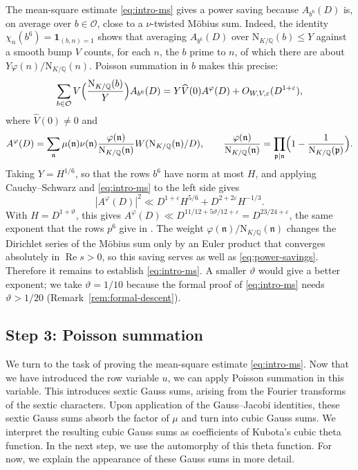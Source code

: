 \documentclass[11pt,a4paper]{article}
\numberwithin{equation}{section}
\numberwithin{figure}{section}
\theoremstyle{definition}
\theoremstyle{remark}
\newcommand{\Q}{\mathbb Q}
\newcommand{\NK}{\mathrm N_{K/\Q}}
\newcommand{\OO}{\mathcal O}
\newcommand{\ind}{\mathbf1}
\newcommand{\Rea}{\operatorname{Re}}
\begin{document}
The mean-square estimate \eqref{eq:intro-ms} gives a power saving because $A_{b^6}(D)$ is, on average over $b\in\OO$, close to a $\nu$-twisted M\"obius sum. Indeed, the identity $\chi_n(b^6)=\ind_{(b,n)=1}$ shows that averaging $A_{b^6}(D)$ over $\NK(b)\le Y$ against a smooth bump $V$ counts, for each $n$, the $b$ prime to $n$, of which there are about $Y\varphi(n)/\NK(n)$. Poisson summation in $b$ makes this precise:
\begin{equation}\label{eq:intro-average}
 \sum_{b\in\OO}V\Bigl(\frac{\NK(b)}{Y}\Bigr)A_{b^6}(D)=Y\widehat V(0)A^\varphi(D)+O_{W,V,\varepsilon}(D^{1+\varepsilon}),
\end{equation}
where $\widehat V(0)\ne0$ and
\[
 A^\varphi(D)=\sum_{\mathfrak n}\mu(\mathfrak n)\nu(\mathfrak n)\frac{\varphi(\mathfrak n)}{\NK(\mathfrak n)}W(\NK(\mathfrak n)/D),
 \qquad
 \frac{\varphi(\mathfrak n)}{\NK(\mathfrak n)}=\prod_{\mathfrak p\mid\mathfrak n}\Bigl(1-\frac1{\NK(\mathfrak p)}\Bigr).
\]
Taking $Y=H^{1/6}$, so that the rows $b^6$ have norm at most $H$, and applying Cauchy--Schwarz and \eqref{eq:intro-ms} to the left side gives
\begin{equation}\label{eq:intro-extraction}
|A^\varphi(D)|^2
\ll D^{1+\varepsilon}H^{5/6}+D^{2+2\varepsilon}H^{-1/3}.
\end{equation}
With $H=D^{1+\vartheta}$, this gives
$A^\varphi(D)\ll D^{11/12+5\vartheta/12+\varepsilon}=D^{23/24+\varepsilon}$, the same exponent that the rows $p^6$ give in \cite{OpenAI26b}. The weight $\varphi(\mathfrak n)/\NK(\mathfrak n)$ changes the Dirichlet series of the M\"obius sum only by an Euler product that converges absolutely in $\Rea s>0$, so this saving serves as well as \eqref{eq:power-savings}.
Therefore it remains to establish \eqref{eq:intro-ms}. A smaller $\vartheta$ would give a better exponent; we take $\vartheta=1/10$ because the formal proof of \eqref{eq:intro-ms} needs $\vartheta>1/20$ (Remark~\ref{rem:formal-descent}).

\subsection{Step 3: Poisson summation}

We turn to the task of proving the mean-square estimate \eqref{eq:intro-ms}. Now that we have introduced the row variable $u$, we can apply Poisson summation in this variable. This introduces sextic Gauss sums, arising from the Fourier transforms of the sextic characters. Upon application of the Gauss--Jacobi identities, these sextic Gauss sums absorb the factor of $\mu$ and turn into cubic Gauss sums. We interpret the resulting cubic Gauss sums as coefficients of Kubota's cubic theta function. In the next step, we use the automorphy of this theta function. For now, we explain the appearance of these Gauss sums in more detail.
\end{document}
